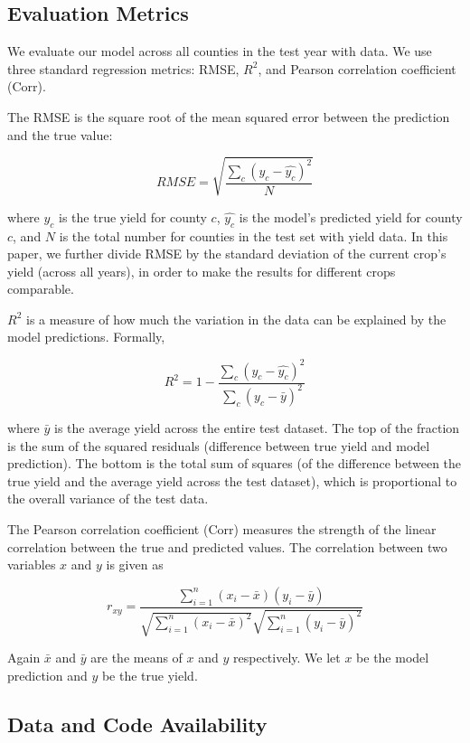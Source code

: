 \subsection{Evaluation Metrics}

We evaluate our model across all counties in the test year with data. We use three standard regression metrics: RMSE, $R^2$, and Pearson correlation coefficient (Corr). 

The RMSE is the square root of the mean squared error between the prediction and the true value:

$$RMSE = \sqrt{\frac{\sum_c (y_c - \widehat{y_c})^2}{N}}$$

where $y_c$ is the true yield for county $c$, $\widehat{y_c}$ is the model's predicted yield for county $c$, and $N$ is the total number for counties in the test set with yield data. In this paper, we further divide RMSE by the standard deviation of the current crop's yield (across all years), in order to make the results for different crops comparable.

$R^2$ is a measure of how much the variation in the data can be explained by the model predictions. Formally,

$$R^2 = 1 - \frac{\sum_c (y_c - \widehat{y_c})^2}{\sum_c (y_c - \bar{y})^2}$$

where $\bar{y}$ is the average yield across the entire test dataset. The top of the fraction is the sum of the squared residuals (difference between true yield and model prediction). The bottom is the total sum of squares (of the difference between the true yield and the average yield across the test dataset), which is proportional to the overall variance of the test data. 

The Pearson correlation coefficient (Corr) measures the strength of the linear correlation between the true and predicted values. The correlation between two variables $x$ and $y$ is given as

$$r_{xy} = \frac{\sum_{i=1}^n (x_i - \bar{x}) (y_i - \bar{y})}{\sqrt{\sum_{i=1}^n (x_i - \bar{x})^2} \sqrt{\sum_{i=1}^n (y_i - \bar{y})^2}}$$

Again $\bar{x}$ and $\bar{y}$ are the means of $x$ and $y$ respectively. We let $x$ be the model prediction and $y$ be the true yield.










\subsection{Data and Code Availability}

